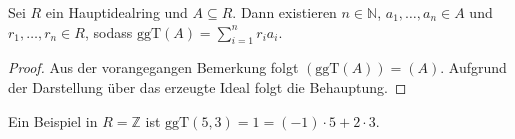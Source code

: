 \begin{lemma}
    Sei $R$ ein Hauptidealring und $A\subseteq R$. Dann existieren
    $n\in\mathbb{N}$, $a_1,\ldots,a_n\in A$ und $r_1,\ldots,r_n\in R$, sodass $\mathrm{ggT}(A)=\sum_{i=1}^nr_ia_i$.
\end{lemma}

\begin{proof}
    Aus der vorangegangen Bemerkung folgt $(\textrm{ggT}(A))=(A)$. Aufgrund der Darstellung über das erzeugte Ideal folgt die Behauptung.
\end{proof}

\begin{example}
    Ein Beispiel in $R=\mathbb{Z}$ ist $\textrm{ggT}(5,3)=1=(-1)\cdot 5+2\cdot 3$.
\end{example}